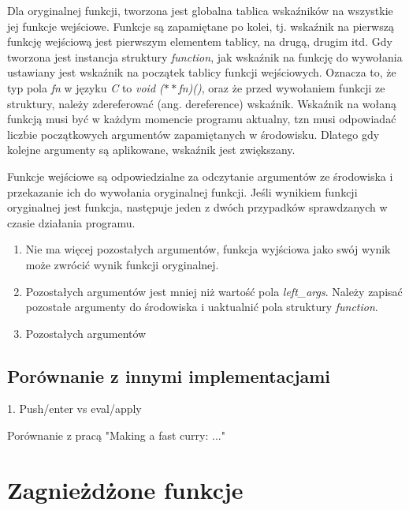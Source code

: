\documentclass[declaration,shortabstract]{iithesis}
\begin{document}
Dla oryginalnej funkcji, tworzona jest globalna tablica wskaźników na wszystkie 
jej funkcje wejściowe. Funkcje są zapamiętane po kolei, tj. 
wskaźnik na pierwszą funkcję wejściową jest pierwszym elementem tablicy, na 
drugą, drugim itd. 
Gdy tworzona jest instancja struktury \textit{function}, jak wskaźnik na 
funkcję do wywołania ustawiany jest wskaźnik na początek tablicy funkcji 
wejściowych. Oznacza to, że typ pola \textit{fn} w języku \textit{C} to 
\textit{void ($\ast\ast$fn)()}, oraz że przed wywołaniem funkcji ze struktury,
należy zdereferować (ang. dereference) wskaźnik. Wskaźnik na wołaną funkcją 
musi być w każdym momencie programu aktualny, tzn musi odpowiadać liczbie 
początkowych argumentów zapamiętanych w środowisku. Dlatego gdy kolejne 
argumenty są aplikowane, wskaźnik jest zwiększany. 


Funkcje wejściowe są odpowiedzialne za odczytanie argumentów ze środowiska i 
przekazanie ich do wywołania oryginalnej funkcji. Jeśli wynikiem funkcji 
oryginalnej jest funkcja, następuje jeden z dwóch przypadków sprawdzanych w
czasie działania programu.

\begin{enumerate}
  \item Nie ma więcej pozostałych argumentów, funkcja wyjściowa jako swój 
  wynik może zwrócić wynik funkcji oryginalnej.
  \item Pozostałych argumentów jest mniej niż wartość pola \textit{left\_args}.
  Należy zapisać pozostałe argumenty do środowiska i uaktualnić pola struktury 
  \textit{function}.
  \item Pozostałych argumentów 
\end{enumerate}

\subsection{Porównanie z innymi implementacjami}

1. Push/enter vs eval/apply

Porównanie z pracą "Making a fast curry: ..."

\section{Zagnieżdżone funkcje}
\end{document}
